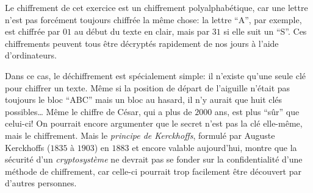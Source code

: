 {{Le chiffrement de cet exercice est un chiffrement polyalphabétique, car une lettre n’est pas forcément toujours chiffrée la même chose: la lettre “A”, par exemple, est chiffrée par $01$ au début du texte en clair, mais par $31$ si elle suit un “S”. Ces chiffrements peuvent tous être décryptés rapidement de nos jours à l’aide d’ordinateurs.

Dans ce cas, le déchiffrement est spécialement simple: il n’existe qu’une seule clé pour chiffrer un texte. Même si la position de départ de l’aiguille n’était pas toujours le bloc “ABC” mais un bloc au hasard, il n’y aurait que huit clés possibles… Même le chiffre de César, qui a plus de $2000$ ans, est plus “sûr” que celui-ci! On pourrait encore argumenter que le secret n’est pas la clé elle-même, mais le chiffrement. Mais le \emph{principe de Kerckhoffs}, formulé par Auguste Kerckhoffs ($1835$ à $1903$) en $1883$ et encore valable aujourd’hui, montre que la sécurité d’un \emph{cryptosystème} ne devrait pas se fonder sur la confidentialité d’une méthode de chiffrement, car celle-ci pourrait trop facilement être découvert par d’autres personnes.



}}
